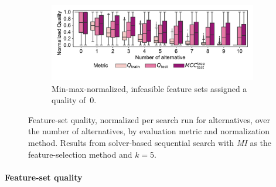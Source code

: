 \documentclass{article}
\theoremstyle{definition}
\begin{document}
\begin{figure}[p]
\begin{subfigure}[t]{\textwidth}
		\label{fig:afs:impact-num-alternatives-quality-min-max}
	\end{subfigure}
	\begin{subfigure}[t]{\textwidth}
		\centering
		\includegraphics[width=\textwidth, trim=14 33 14 16, clip]{plots/afs-impact-num-alternatives-quality-min-max-fillna.pdf}
		\caption{Min-max-normalized, infeasible feature sets assigned a quality of~0.}
		\label{fig:afs:impact-num-alternatives-quality-min-max-fillna}
	\end{subfigure}
	\caption{
		Feature-set quality, normalized per search run for alternatives, over the number of alternatives, by evaluation metric and normalization method.
		Results from solver-based sequential search with \emph{MI} as the feature-selection method and $k=5$.
	}
	\label{fig:afs:impact-num-alternatives-quality}
\end{figure}

\paragraph{Feature-set quality}
\end{document}
